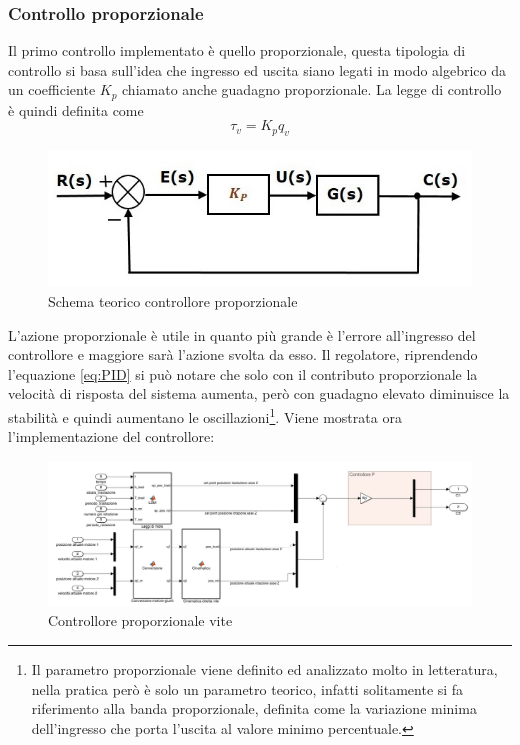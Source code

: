 \subsubsection{Controllo proporzionale}
Il primo controllo implementato è quello proporzionale, questa tipologia di controllo si basa sull'idea che ingresso ed uscita siano legati in modo algebrico da un coefficiente $K_p$ chiamato anche guadagno proporzionale. La legge di controllo è quindi definita come
\begin{equation}
\tau_v = K_p q_v
\end{equation}
\begin{figure}[ht]
	\begin{center}
		\includegraphics[scale=0.6]{Immagini/Controllori/Pschema}
		\caption{Schema teorico controllore proporzionale}
		\label{fig:Pschema}
	\end{center}
\end{figure}
L'azione proporzionale è utile in quanto più grande è l'errore all'ingresso del controllore e maggiore sarà l'azione svolta da esso. Il regolatore, riprendendo l'equazione \ref{eq:PID} si può notare che solo con il contributo proporzionale la velocità di risposta del sistema aumenta, però con guadagno elevato diminuisce la stabilità e quindi aumentano le oscillazioni\footnote{Il parametro proporzionale viene definito ed analizzato molto in letteratura, nella pratica però è solo un parametro teorico, infatti solitamente si fa riferimento alla banda proporzionale, definita come la variazione minima dell'ingresso che porta l'uscita al valore minimo percentuale.}.
Viene mostrata ora l'implementazione del controllore:
\begin{figure}[ht]
	\begin{center}
		\includegraphics[scale=0.37]{Immagini/Controllori/ViteP}
		\caption{Controllore proporzionale vite}
		\label{fig:PVite}
	\end{center}
\end{figure}
